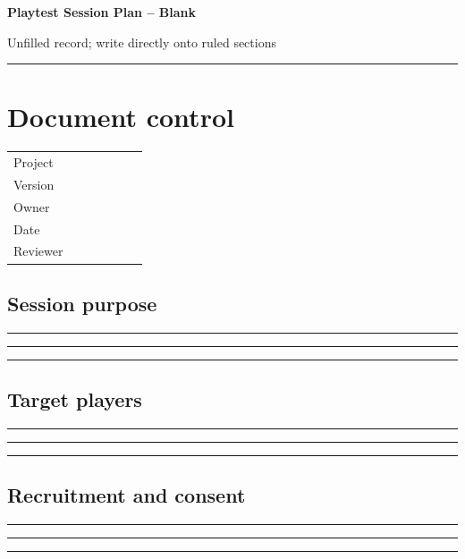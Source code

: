 \documentclass[11pt]{article}
\begin{document}
{\huge\bfseries\color{suiteblue} Playtest Session Plan -- Blank}\par
\vspace{0.15in}
{\normalsize\color{suitegray} Unfilled record; write directly onto ruled sections}\par
\vspace{0.15in}\hrule\vspace{0.15in}

\section{Document control}
\renewcommand{\arraystretch}{1.8}
\begin{tabularx}{\linewidth}{@{}p{0.30\linewidth}X@{}}\toprule
Project & \hrulefill\\ Version & \hrulefill\\ Owner & \hrulefill\\ Date & \hrulefill\\ Reviewer & \hrulefill\\ \bottomrule\end{tabularx}

\subsection{Session purpose}
\noindent\rule{\linewidth}{0.3pt}\par\vspace{0.18in}
\noindent\rule{\linewidth}{0.3pt}\par\vspace{0.18in}
\noindent\rule{\linewidth}{0.3pt}\par\vspace{0.14in}

\subsection{Target players}
\noindent\rule{\linewidth}{0.3pt}\par\vspace{0.18in}
\noindent\rule{\linewidth}{0.3pt}\par\vspace{0.18in}
\noindent\rule{\linewidth}{0.3pt}\par\vspace{0.14in}

\subsection{Recruitment and consent}
\noindent\rule{\linewidth}{0.3pt}\par\vspace{0.18in}
\noindent\rule{\linewidth}{0.3pt}\par\vspace{0.18in}
\noindent\rule{\linewidth}{0.3pt}\par\vspace{0.14in}
\end{document}
